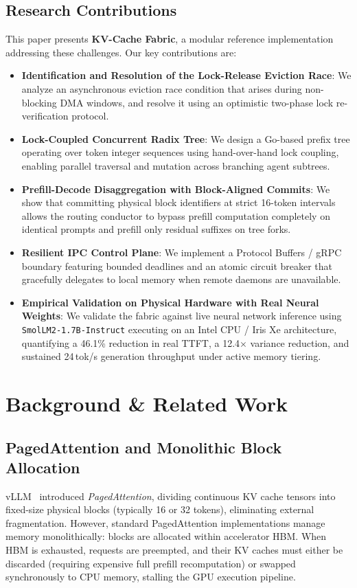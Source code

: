 \documentclass[10pt,twocolumn,letterpaper]{article}
\begin{document}
\subsection{Research Contributions}
This paper presents \textbf{KV-Cache Fabric}, a modular reference implementation addressing these challenges. Our key contributions are:
\begin{itemize}
    \item \textbf{Identification and Resolution of the Lock-Release Eviction Race}: We analyze an asynchronous eviction race condition that arises during non-blocking DMA windows, and resolve it using an optimistic two-phase lock re-verification protocol.
    \item \textbf{Lock-Coupled Concurrent Radix Tree}: We design a Go-based prefix tree operating over token integer sequences using hand-over-hand lock coupling, enabling parallel traversal and mutation across branching agent subtrees.
    \item \textbf{Prefill-Decode Disaggregation with Block-Aligned Commits}: We show that committing physical block identifiers at strict 16-token intervals allows the routing conductor to bypass prefill computation completely on identical prompts and prefill only residual suffixes on tree forks.
    \item \textbf{Resilient IPC Control Plane}: We implement a Protocol Buffers / gRPC boundary featuring bounded deadlines and an atomic circuit breaker that gracefully delegates to local memory when remote daemons are unavailable.
    \item \textbf{Empirical Validation on Physical Hardware with Real Neural Weights}: We validate the fabric against live neural network inference using \texttt{SmolLM2-1.7B-Instruct} executing on an Intel CPU / Iris Xe architecture, quantifying a 46.1\% reduction in real TTFT, a 12.4$\times$ variance reduction, and sustained 24\,tok/s generation throughput under active memory tiering.
\end{itemize}

\section{Background \& Related Work}

\subsection{PagedAttention and Monolithic Block Allocation}
vLLM~\cite{kwon2023pagedattention} introduced \textit{PagedAttention}, dividing continuous KV cache tensors into fixed-size physical blocks (typically 16 or 32 tokens), eliminating external fragmentation. However, standard PagedAttention implementations manage memory monolithically: blocks are allocated within accelerator HBM. When HBM is exhausted, requests are preempted, and their KV caches must either be discarded (requiring expensive full prefill recomputation) or swapped synchronously to CPU memory, stalling the GPU execution pipeline.
\end{document}
